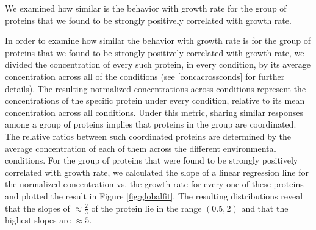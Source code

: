 We examined how similar is the behavior with growth rate for the group of proteins that we found to be strongly positively correlated with growth rate.

In order to examine how similar the behavior with growth rate is for the group of proteins that we found to be strongly positively correlated with growth rate, we divided the concentration of every such protein, in every condition, by its average concentration across all of the conditions (see \ref{concacrossconds} for further details).
The resulting normalized concentrations across conditions represent the concentrations of the specific protein under every condition, relative to its mean concentration across all conditions.
Under this metric, sharing similar responses among a group of proteins implies that proteins in the group are coordinated.
The relative ratios between such coordinated proteins are determined by the average concentration of each of them across the different environmental conditions.
For the group of proteins that were found to be strongly positively correlated with growth rate, we calculated the slope of a linear regression line for the normalized concentration vs. the growth rate for every one of these proteins and plotted the result in Figure \ref{fig:globalfit}.
The resulting distributions reveal that the slopes of $\approx \frac{2}{3}$ of the protein lie in the range $(0.5,2)$ and that the highest slopes are $\approx 5$.